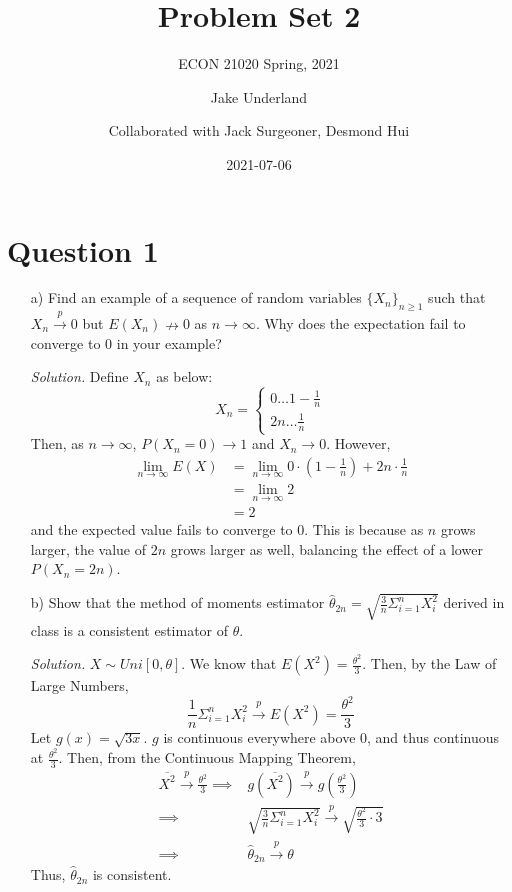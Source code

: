 \documentclass[
]{article}
\title{Problem Set 2}
\subtitle{ECON 21020 Spring, 2021}
\author{Jake Underland \and Collaborated with Jack Surgeoner, Desmond Hui}
\date{2021-07-06}
\begin{document}
\maketitle

{
\setcounter{tocdepth}{2}
\tableofcontents
}
\newcommand*{\plim}{\text{plim}}

\hypertarget{question-1}{%
\section{Question 1}\label{question-1}}

\begin{enumerate}

\item[a)] Find an example of a sequence of random variables $\{X_n\}_{n\geq 1}$ such that $X_n \stackrel{p}{\to} 0$ but $E(X_n) \nrightarrow 0$ as $n \to \infty$. Why does the expectation fail to converge to 0 in your example?  
  
\textit{Solution.} Define $X_n$ as below:
\[X_n = \begin{cases} 0 \dots 1 - \frac{1}{n} \\ 2n \dots \frac{1}{n}\end{cases}\]
Then, as $n \to \infty$, $P(X_n = 0) \to 1$ and $X_n \to 0$. However, 
\[\begin{aligned}
\lim _{n \to \infty}E(X) &= \lim_{n\to\infty} 0 \cdot (1 - \frac{1}{n}) + 2n \cdot \frac{1}{n} \\
&= \lim _{n\to\infty} 2 \\
&= 2
\end{aligned}\] 
and the expected value fails to converge to $0$. This is because as $n$ grows larger, the value of $2n$ grows larger as well, balancing the effect of a lower $P(X_n = 2n)$.  

\item[b)] Show that the method of moments estimator $\hat{\theta}_{2n} = \sqrt{\frac{3}{n}\Sigma^n_{i=1}X_i ^2}$ derived in class is a consistent
estimator of $\theta$.  
  
\textit{Solution.} $X \sim Uni[0, \theta]$. We know that $E(X^2) = \frac{\theta^2}{3}$. 
Then, by the Law of Large Numbers, 
\[\frac{1}{n} \Sigma ^n _{i=1} X_i ^2 \stackrel{p}{\to} E(X^2) = \frac{\theta^2}{3}\]
Let $g(x) = \sqrt{3x}$. $g$ is continuous everywhere above $0$, and thus continuous at $ \frac{\theta^2}{3}$.  
Then, from the Continuous Mapping Theorem, 
\[\begin{aligned} 
\overline{X^2} \stackrel{p}{\to} \frac{\theta^2}{3} \implies& g(\overline{X^2}) \stackrel{p}{\to} g(\frac{\theta^2}{3}) \\
\implies& \sqrt{\frac{3}{n}\Sigma^n_{i=1}X_i ^2} \stackrel{p}{\to} \sqrt{\frac{\theta^2}{3} \cdot 3} \\
\implies& \hat{\theta}_{2n}  \stackrel{p}{\to} \theta
\end{aligned}\]
Thus, $\hat{\theta}_{2n}$ is consistent. 
\end{enumerate}
\end{document}
